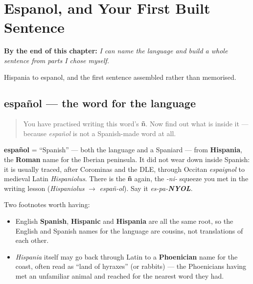 
\chapter{Espanol, and Your First Built Sentence}
\label{ch:spanish-espanol}

\begin{chapteropening}
\textbf{By the end of this chapter:} \emph{I can name the language and build a whole sentence from parts I chose myself.}

Hispania to espanol, and the first sentence assembled rather than memorised.
\end{chapteropening}

\section[español]{español — the word for the language}

\label{lesson:ES-C06-espanol}



\begin{quote}
You have practised writing this word's \textbf{ñ}. Now find out what is inside it — because \emph{español} is not a Spanish-made word at all.
\end{quote}

\begin{cousinweb}
\textbf{español} = \textquotedblleft{}Spanish\textquotedblright{} — both the language and a Spaniard — from \textbf{Hispania}, the \textbf{Roman} name for the Iberian peninsula. It did not wear down inside Spanish: it is usually traced, after Corominas and the DLE, through Occitan \emph{espaignol} to medieval Latin \emph{Hispaniolus}. There is the \textbf{ñ} again, the \emph{-ni-} squeeze you met in the writing lesson (\emph{Hispaniolus} $\to$ \emph{españ-ol}). Say it \emph{es-pa-\textbf{NYOL}}.

Two footnotes worth having:

\begin{itemize}
\raggedright
  \item English \textbf{Spanish}, \textbf{Hispanic} and \textbf{Hispania} are all the same root, so the English and Spanish names for the language are cousins, not translations of each other.
  \item \emph{Hispania} itself may go back through Latin to a \textbf{Phoenician} name for the coast, often read as \textquotedblleft{}land of hyraxes\textquotedblright{} (or rabbits) — the Phoenicians having met an unfamiliar animal and reached for the nearest word they had.
\end{itemize}
\end{cousinweb}

